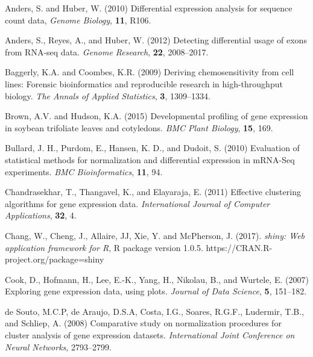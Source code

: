 \documentclass{bioinfo}
\begin{document}
\begin{thebibliography}{}


Anders, S. and Huber, W. (2010) Differential expression analysis for sequence count data, {\it Genome Biology}, {\bf 11}, R106.

Anders, S., Reyes, A., and Huber, W. (2012) Detecting differential usage of exons from RNA-seq data. {\it Genome Research}, {\bf 22}, 2008--2017.

Baggerly, K.A. and Coombes, K.R. (2009) Deriving chemosensitivity from cell lines: Forensic bioinformatics and reproducible research in high-throughput biology. {\it The Annals of Applied Statistics}, {\bf 3}, 1309--1334.

Brown, A.V. and Hudson, K.A. (2015) Developmental profiling of gene expression in soybean trifoliate leaves and cotyledons. {\it BMC Plant Biology}, {\bf 15}, 169.

Bullard, J. H., Purdom, E., Hansen, K. D., and Dudoit, S. (2010) Evaluation of statistical methods for normalization and differential expression in mRNA-Seq experiments. {\it BMC Bioinformatics}, {\bf 11}, 94.

Chandrasekhar, T., Thangavel, K., and Elayaraja, E. (2011) Effective clustering algorithms for
gene expression data. {\it International Journal of Computer Applications}, {\bf 32}, 4.

Chang, W., Cheng, J., Allaire, JJ, Xie, Y. and McPherson, J. (2017). {\it shiny: Web application framework for R}, R package version 1.0.5. https://CRAN.R-project.org/package=shiny

Cook, D., Hofmann, H., Lee, E.-K., Yang, H., Nikolau, B., and Wurtele, E. (2007) Exploring gene expression data, using plots. {\it Journal of Data Science}, {\bf 5}, 151--182.

de Souto, M.C.P, de Araujo, D.S.A, Costa, I.G., Soares, R.G.F., Ludermir, T.B., and Schliep, A. (2008) Comparative study on normalization procedures for cluster analysis of gene expression datasets. {\it International Joint Conference on Neural Networks}, 2793--2799.


\end{thebibliography}
\end{document}
